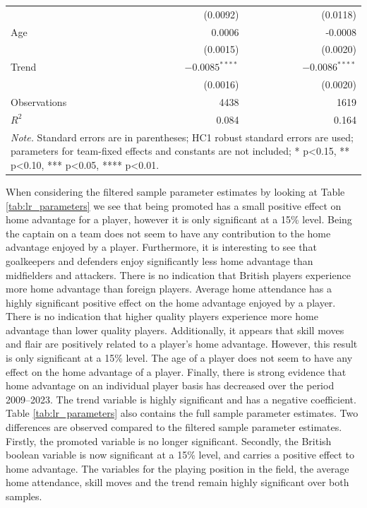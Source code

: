 \begin{table}[htbp]
\begin{spacing}{1.5}
\begin{tabular}{p{7cm}rr}
              & (0.0092) & (0.0118) \\
        Age   & 0.0006 & -0.0008 \\
              & (0.0015) & (0.0020) \\
        Trend & $-0.0085^{****}$ & $-0.0086^{****}$ \\
              & (0.0016) & (0.0020) \\
        Observations & 4438  & 1619 \\
        $R^2$    & 0.084 & 0.164 \\
        \bottomrule
        \bottomrule
        \multicolumn{3}{p{12cm}}{\footnotesize\textit{Note.} Standard errors are in parentheses; HC1 robust standard errors are used; parameters for team-fixed effects and constants are not included; * p\textless 0.15, ** p\textless 0.10, *** p\textless0.05, **** p\textless0.01.}
    \end{tabular}
    \end{spacing}
\end{table}%

\noindent
When considering the filtered sample parameter estimates by looking at Table \ref{tab:lr_parameters} we see that being promoted has a small positive effect on home advantage for a player, however it is only significant at a 15\% level. Being the captain on a team does not seem to have any contribution to the home advantage enjoyed by a player. Furthermore, it is interesting to see that goalkeepers and defenders enjoy significantly less home advantage than midfielders and attackers. There is no indication that British players experience more home advantage than foreign players. Average home attendance has a highly significant positive effect on the home advantage enjoyed by a player. There is no indication that higher quality players experience more home advantage than lower quality players. Additionally, it appears that skill moves and flair are positively related to a player's home advantage. However, this result is only significant at a 15\% level. The age of a player does not seem to have any effect on the home advantage of a player. Finally, there is strong evidence that home advantage on an individual player basis has decreased over the period 2009--2023. The trend variable is highly significant and has a negative coefficient. \\

\noindent
Table \ref{tab:lr_parameters} also contains the full sample parameter estimates. Two differences are observed compared to the filtered sample parameter estimates. Firstly, the promoted variable is no longer significant. Secondly, the British boolean variable is now significant at a 15\% level, and carries a positive effect to home advantage. The variables for the playing position in the field, the average home attendance, skill moves and the trend remain highly significant over both samples. \\

